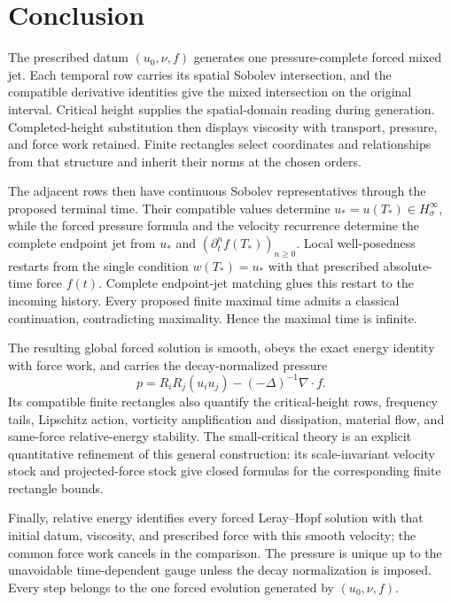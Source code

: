 \clearpage
\section{Conclusion}

The prescribed datum \((u_0,\nu,f)\) generates one pressure-complete forced
mixed jet. Each temporal row carries its spatial Sobolev intersection, and
the compatible derivative identities give the mixed intersection on the
original interval. Critical height supplies the spatial-domain reading
during generation. Completed-height substitution then displays viscosity
with transport, pressure, and force work retained. Finite rectangles select
coordinates and relationships from that structure and inherit their norms
at the chosen orders.

The adjacent rows then have continuous Sobolev representatives through the
proposed terminal time.  Their compatible values determine
\(u_*=u(T_*)\in H^\infty_\sigma\), while the forced pressure formula and the
velocity recurrence determine the complete endpoint jet from \(u_*\) and
\((\partial_t^nf(T_*))_{n\ge0}\).  Local well-posedness restarts from the
single condition \(w(T_*)=u_*\) with that prescribed absolute-time force
\(f(t)\).  Complete endpoint-jet matching glues this restart to the incoming
history.  Every proposed finite
maximal time admits a classical continuation, contradicting
maximality. Hence the maximal time is infinite.

The resulting global forced solution is smooth, obeys the exact energy
identity with force work, and carries the decay-normalized pressure
\[
 p=R_iR_j(u_i u_j)-(-\Delta)^{-1}\nabla\cdot f.
\]
Its compatible finite rectangles also quantify the critical-height rows, frequency
tails, Lipschitz action, vorticity amplification and dissipation, material
flow, and same-force relative-energy stability.  The small-critical theory is
an explicit quantitative refinement of this general construction: its
scale-invariant velocity stock and projected-force stock give closed formulas
for the corresponding finite rectangle bounds.

Finally, relative energy identifies every forced Leray--Hopf solution with that initial datum, viscosity, and prescribed force with this smooth velocity;
the common force work cancels in the comparison.  The pressure is unique up to
the unavoidable time-dependent gauge unless the decay normalization is
imposed.  Every step belongs to the one forced evolution generated by
\((u_0,\nu,f)\).
